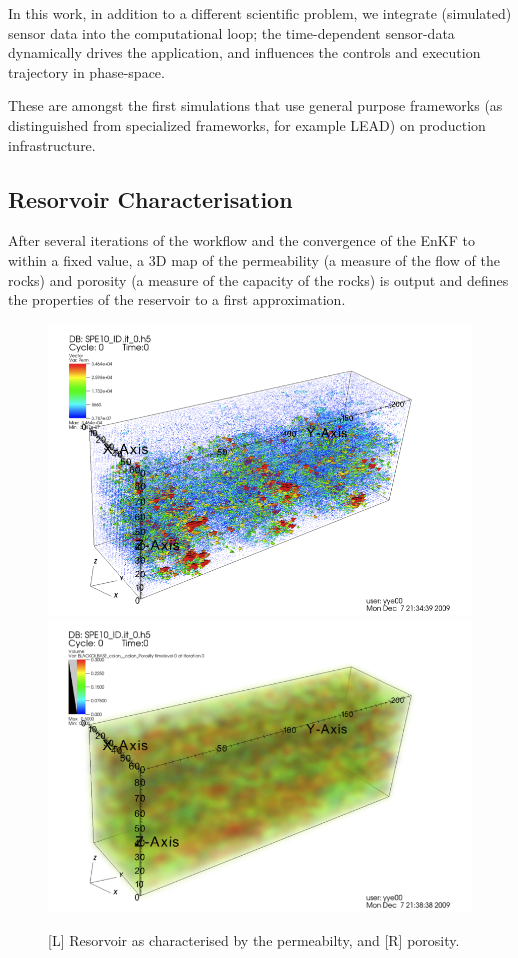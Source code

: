 \documentclass{rspublic}
\begin{document}
In this work, in addition to a different scientific problem, we
integrate (simulated) sensor data into the computational loop; the
time-dependent sensor-data dynamically drives the application, and
influences the controls and execution trajectory in phase-space.

These are amongst the first simulations
that use general purpose frameworks (as distinguished from specialized
frameworks, for example LEAD) on production infrastructure.

\subsection{Resorvoir Characterisation}

After several iterations of the workflow and the convergence of the
EnKF to within a fixed value, a 3D map of the permeability (a measure of the flow
of the rocks) and porosity (a measure of the capacity of the rocks) is 
output and defines the properties of the reservoir to a first
approximation. \begin{figure}
\begin{center}
\includegraphics[scale=0.45]{figures/permeability.png}
\includegraphics[scale=0.45]{figures/porosity.png}
\end{center}
\caption[Simulation Output]{[L] Resorvoir as characterised by the
  permeabilty, and [R] porosity. }
\label{}
\end{figure}
\end{document}
